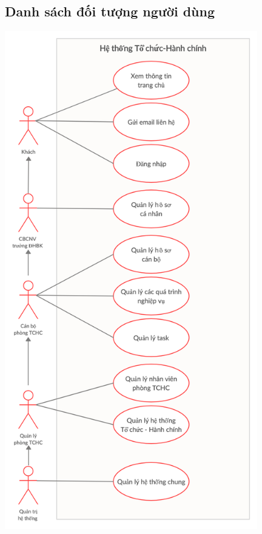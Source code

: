 \subsection{Danh sách đối tượng người dùng}
\begin{center}
  \captionsetup{type=figure}
  \includegraphics[width=11cm]{img/usecase/rootUsecase.png}
\end{center}
